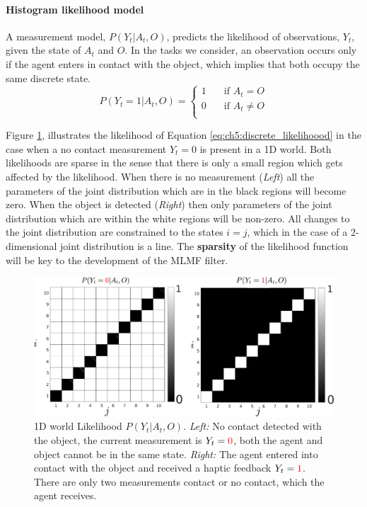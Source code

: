 \paragraph{Histogram likelihood model}

A measurement model, $P(Y_t|A_t,O)$, predicts the likelihood of observations, $Y_t$, given the state of $A_t$ and $O$. 
In the tasks we consider, an observation occurs only if the agent enters in contact with the object, which implies that both
occupy the same discrete state. 
\begin{equation} \label{eq:ch5:discrete_likelihoood}
P(Y_t=1|A_t,O) =
  \begin{cases}
    1       & \quad \text{if } A_t = O     \\
    0  	    & \quad \text{if } A_t \not= O \\
  \end{cases}
\end{equation}

Figure \ref{fig:histogram_likelihood}, illustrates the likelihood of Equation \ref{eq:ch5:discrete_likelihoood} 
in the case when a no contact measurement $Y_t=0$ is present in a 1D world. Both likelihoods are sparse in the sense that there is only a small 
region which gets affected by the likelihood. When there is no measurement (\textit{Left}) all the parameters of the 
joint distribution which are in the black regions will become zero. When the object is detected (\textit{Right}) then 
only parameters of the joint distribution which are within the white regions will be non-zero. All changes
to the joint distribution are constrained to the states $i = j$, which in the case of a 2-dimensional joint 
distribution is a line. The \textbf{sparsity} of the likelihood function  will be key to the development of the MLMF filter.

\begin{figure}
 \centering
 \includegraphics[width=\textwidth]{./ch5-MLMF/Figures/explenation/hist_likelihood.pdf}
 \caption{1D world Likelihood $P(Y_t|A_t,O)$. \textit{Left:} No contact detected with the object, the current measurement 
 is $Y_t = \textcolor{red}0$, both the agent and object cannot be in the same state. \textit{Right:} The agent 
 entered into contact with the object and received a haptic feedback $Y_t = \textcolor{red}1$. There are only two measurements 
 contact or no contact, which the agent receives.}
 \label{fig:histogram_likelihood}
\end{figure}

